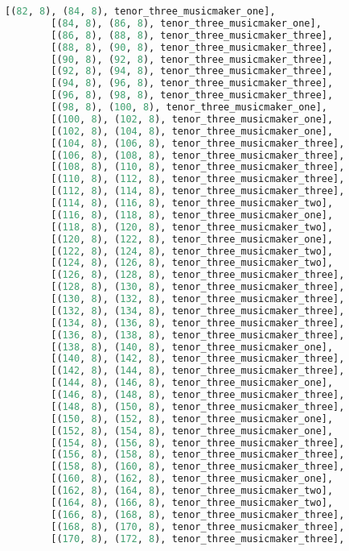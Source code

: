 \begin{lstlisting}[language=Python, caption=Invocation Source Code]
        [(82, 8), (84, 8), tenor_three_musicmaker_one],
        [(84, 8), (86, 8), tenor_three_musicmaker_one],
        [(86, 8), (88, 8), tenor_three_musicmaker_three],
        [(88, 8), (90, 8), tenor_three_musicmaker_three],
        [(90, 8), (92, 8), tenor_three_musicmaker_three],
        [(92, 8), (94, 8), tenor_three_musicmaker_three],
        [(94, 8), (96, 8), tenor_three_musicmaker_three],
        [(96, 8), (98, 8), tenor_three_musicmaker_three],
        [(98, 8), (100, 8), tenor_three_musicmaker_one],
        [(100, 8), (102, 8), tenor_three_musicmaker_one],
        [(102, 8), (104, 8), tenor_three_musicmaker_one],
        [(104, 8), (106, 8), tenor_three_musicmaker_three],
        [(106, 8), (108, 8), tenor_three_musicmaker_three],
        [(108, 8), (110, 8), tenor_three_musicmaker_three],
        [(110, 8), (112, 8), tenor_three_musicmaker_three],
        [(112, 8), (114, 8), tenor_three_musicmaker_three],
        [(114, 8), (116, 8), tenor_three_musicmaker_two],
        [(116, 8), (118, 8), tenor_three_musicmaker_one],
        [(118, 8), (120, 8), tenor_three_musicmaker_two],
        [(120, 8), (122, 8), tenor_three_musicmaker_one],
        [(122, 8), (124, 8), tenor_three_musicmaker_two],
        [(124, 8), (126, 8), tenor_three_musicmaker_two],
        [(126, 8), (128, 8), tenor_three_musicmaker_three],
        [(128, 8), (130, 8), tenor_three_musicmaker_three],
        [(130, 8), (132, 8), tenor_three_musicmaker_three],
        [(132, 8), (134, 8), tenor_three_musicmaker_three],
        [(134, 8), (136, 8), tenor_three_musicmaker_three],
        [(136, 8), (138, 8), tenor_three_musicmaker_three],
        [(138, 8), (140, 8), tenor_three_musicmaker_one],
        [(140, 8), (142, 8), tenor_three_musicmaker_three],
        [(142, 8), (144, 8), tenor_three_musicmaker_three],
        [(144, 8), (146, 8), tenor_three_musicmaker_one],
        [(146, 8), (148, 8), tenor_three_musicmaker_three],
        [(148, 8), (150, 8), tenor_three_musicmaker_three],
        [(150, 8), (152, 8), tenor_three_musicmaker_one],
        [(152, 8), (154, 8), tenor_three_musicmaker_one],
        [(154, 8), (156, 8), tenor_three_musicmaker_three],
        [(156, 8), (158, 8), tenor_three_musicmaker_three],
        [(158, 8), (160, 8), tenor_three_musicmaker_three],
        [(160, 8), (162, 8), tenor_three_musicmaker_one],
        [(162, 8), (164, 8), tenor_three_musicmaker_two],
        [(164, 8), (166, 8), tenor_three_musicmaker_two],
        [(166, 8), (168, 8), tenor_three_musicmaker_three],
        [(168, 8), (170, 8), tenor_three_musicmaker_three],
        [(170, 8), (172, 8), tenor_three_musicmaker_three],

\end{lstlisting}
